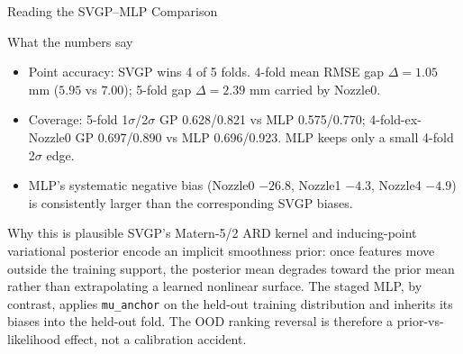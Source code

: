 \documentclass[UTF8,aspectratio=169]{ctexbeamer}
\newcommand{\good}[1]{\textcolor{green!45!black}{#1}}
\begin{document}
\begin{frame}{Reading the SVGP--MLP Comparison}
\small
\begin{block}{What the numbers say}
\begin{itemize}\setlength\itemsep{3pt}
  \item Point accuracy: SVGP wins 4 of 5 folds. 4-fold mean RMSE gap \(\Delta = 1.05\) mm
        (\(5.95\) vs \(7.00\)); 5-fold gap \(\Delta = 2.39\) mm carried by Nozzle0.
  \item Coverage: 5-fold 1\(\sigma\)/2\(\sigma\) GP \good{0.628}/0.821 vs MLP 0.575/0.770;
        4-fold-ex-Nozzle0 GP 0.697/0.890 vs MLP 0.696/\good{0.923}. MLP keeps only a small
        4-fold 2\(\sigma\) edge.
  \item MLP's systematic negative bias (Nozzle0 \(-26.8\), Nozzle1 \(-4.3\), Nozzle4 \(-4.9\))
        is consistently larger than the corresponding SVGP biases.
\end{itemize}
\end{block}

\begin{block}{Why this is plausible}
SVGP's Matern-5/2 ARD kernel and inducing-point variational posterior encode an implicit
smoothness prior: once features move outside the training support, the posterior mean
degrades toward the prior mean rather than extrapolating a learned nonlinear surface. The
staged MLP, by contrast, applies \texttt{mu\_anchor} on the held-out training distribution
and inherits its biases into the held-out fold. The OOD ranking reversal is therefore a
prior-vs-likelihood effect, not a calibration accident.
\end{block}
\end{frame}
\end{document}
